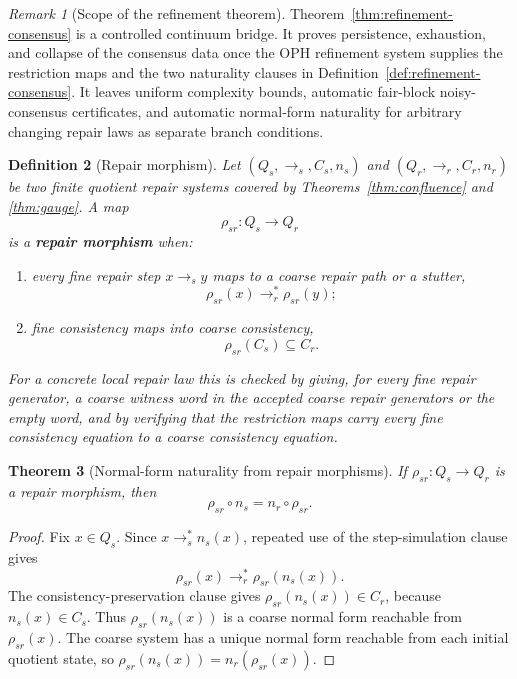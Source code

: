 \documentclass[11pt]{article}
\newtheorem{theorem}{Theorem}[section]
\newtheorem{definition}[theorem]{Definition}
\theoremstyle{remark}
\newtheorem{remark}[theorem]{Remark}
\theoremstyle{plain}
\begin{document}
\begin{remark}[Scope of the refinement theorem]\label{rem:refinement-consensus}
Theorem~\ref{thm:refinement-consensus} is a controlled continuum bridge. It proves persistence,
exhaustion, and collapse of the consensus data once the OPH refinement system supplies the
restriction maps and the two naturality clauses in Definition~\ref{def:refinement-consensus}. It
leaves uniform complexity bounds, automatic fair-block noisy-consensus certificates, and
automatic normal-form naturality for arbitrary changing repair laws as separate branch conditions.
\end{remark}

\begin{definition}[Repair morphism]\label{def:repair-morphism}
Let \((Q_s,\to_s,C_s,n_s)\) and \((Q_r,\to_r,C_r,n_r)\) be two finite quotient repair systems
covered by Theorems~\ref{thm:confluence} and \ref{thm:gauge}. A map
\[
\rho_{sr}:Q_s\to Q_r
\]
is a \textbf{repair morphism} when:
\begin{enumerate}[label=(\roman*),leftmargin=2em]
\item every fine repair step \(x\to_s y\) maps to a coarse repair path or a stutter,
\[
\rho_{sr}(x)\to_r^*\rho_{sr}(y);
\]
\item fine consistency maps into coarse consistency,
\[
\rho_{sr}(C_s)\subseteq C_r.
\]
\end{enumerate}
For a concrete local repair law this is checked by giving, for every fine repair generator, a
coarse witness word in the accepted coarse repair generators or the empty word, and by verifying
that the restriction maps carry every fine consistency equation to a coarse consistency equation.
\end{definition}

\begin{theorem}[Normal-form naturality from repair morphisms]\label{thm:repair-morphism-naturality}
If \(\rho_{sr}:Q_s\to Q_r\) is a repair morphism, then
\[
\rho_{sr}\circ n_s=n_r\circ\rho_{sr}.
\]
\end{theorem}

\begin{proof}
Fix \(x\in Q_s\). Since \(x\to_s^* n_s(x)\), repeated use of the step-simulation clause gives
\[
\rho_{sr}(x)\to_r^*\rho_{sr}(n_s(x)).
\]
The consistency-preservation clause gives \(\rho_{sr}(n_s(x))\in C_r\), because
\(n_s(x)\in C_s\). Thus \(\rho_{sr}(n_s(x))\) is a coarse normal form reachable from
\(\rho_{sr}(x)\). The coarse system has a unique normal form reachable from each initial quotient
state, so \(\rho_{sr}(n_s(x))=n_r(\rho_{sr}(x))\).
\end{proof}
\end{document}
